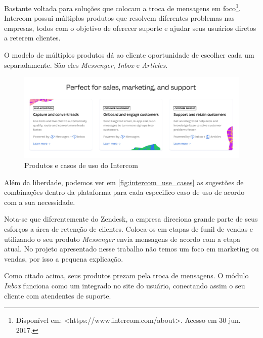Bastante voltada para soluções que colocam a troca de mensagens em foco\footnote{Disponível em: <https://www.intercom.com/about>. Acesso em 30 jun. 2017.}. Intercom possui múltiplos produtos que resolvem diferentes problemas nas empresas, todos com o objetivo de oferecer suporte e ajudar seus usuários diretos a reterem clientes.

O modelo de múltiplos produtos dá ao cliente oportunidade de escolher cada um separadamente. São eles \textit{Messenger}, \textit{Inbox} e \textit{Articles}.

\begin{figure}[ht!]
	\centering
		\includegraphics[scale=0.2]{figures/intercom-use-cases.jpg} 
	\caption{Produtos e casos de uso do Intercom}
	\label{fig:intercom_use_cases}
\end{figure}

Além da liberdade, podemos ver em \autoref{fig:intercom_use_cases} as sugestões de combinações dentro da plataforma para cada especifico caso de uso de acordo com a sua necessidade.

Nota-se que diferentemente do Zendesk, a empresa direciona grande parte de seus esforços a área de retenção de clientes. Coloca-os em etapas de funil de vendas e utilizando o seu produto \textit{Messenger} envia mensagens de acordo com a etapa atual. No projeto apresentado nesse trabalho não temos um foco em marketing ou vendas, por isso a pequena explicação.

Como citado acima, seus produtos prezam pela troca de mensagens. O módulo \textit{Inbox} funciona como um  integrado no site do usuário, conectando assim o seu cliente com atendentes de suporte.

